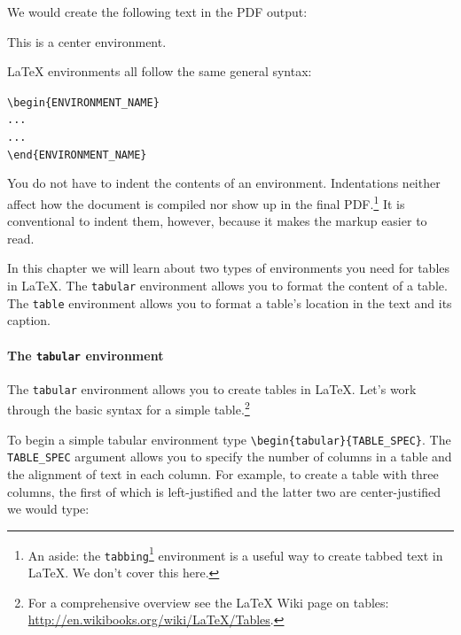 \noindent We would create the following text in the PDF output:

\begin{center}
    This is a center environment.
\end{center}

\noindent LaTeX environments all follow the same general syntax:

\begin{knitrout}
\color{fgcolor}\begin{kframe}
\begin{alltt}
\textbackslash{}begin\{ENVIRONMENT_NAME\}
    . . .
    . . .
\textbackslash{}end\{ENVIRONMENT_NAME\}
\end{alltt}
\end{kframe}
\end{knitrout}


\noindent You do not have to indent the contents of an environment. Indentations neither affect how the document is compiled nor show up in the final PDF.\footnote{An aside: the \texttt{tabbing}\footnote{tabbing, LaTeX environment} environment is a useful way to create tabbed text in LaTeX. We don't cover this here.} It is conventional to indent them, however, because it makes the markup easier to read.

In this chapter we will learn about two types of environments you need for tables in LaTeX. The \texttt{tabular} environment allows you to format the content of a table. The \texttt{table} environment allows you to format a table's location in the text and its caption.

\paragraph{The \texttt{tabular} environment}

The \texttt{tabular} environment allows you to create tables in LaTeX. Let's work through the basic syntax for a simple table.\footnote{For a comprehensive overview see the LaTeX Wiki page on tables: \url{http://en.wikibooks.org/wiki/LaTeX/Tables}.} 

To begin a simple tabular environment type \verb|\begin{tabular}{TABLE_SPEC}|. The \verb|TABLE_SPEC| argument allows you to specify the number of columns in a table and the alignment of text in each column. For example, to create a table with three columns, the first of which is left-justified and the latter two are center-justified we would type:


